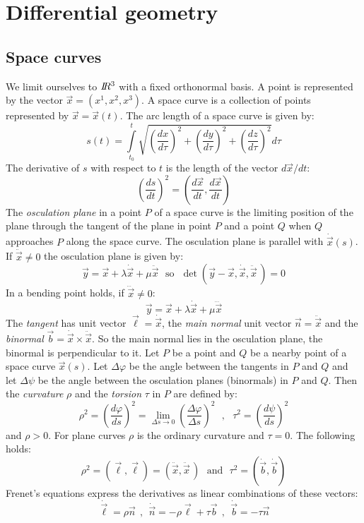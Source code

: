 \documentclass[twoside]{report}
\begin{document}
\section{Differential geometry}
\subsection{Space curves}
We limit ourselves to $I\hspace{-1mm}R^3$ with a fixed orthonormal basis. A point is
represented by the vector $\vec{x}=(x^1,x^2,x^3)$. A space curve is a
collection of points represented by $\vec{x}=\vec{x}(t)$. The arc length of a
space curve is given by:
\[
s(t)=\int\limits_{t_0}^t\sqrt{\left(\frac{dx}{d\tau}\right)^2+\left(\frac{dy}{d\tau}\right)^2+\left(\frac{dz}{d\tau}\right)^2}d\tau
\]
The derivative of $s$ with respect to $t$ is the length of the vector $d\vec{x}/dt$:
\[
\left(\frac{ds}{dt}\right)^2=\left(\frac{d\vec{x}}{dt},\frac{d\vec{x}}{dt}\right)
\]
The {\it osculation plane} in a point $P$ of a space curve is the limiting
position of the plane through the tangent of the plane in point $P$ and a point
$Q$ when $Q$ approaches $P$ along the space curve. The osculation plane is
parallel with $\dot{\vec{x}}(s)$. If $\ddot{\vec{x}}\neq0$ the osculation
plane is given by:
\[
\vec{y}=\vec{x}+\lambda\dot{\vec{x}}+\mu\ddot{\vec{x}}~~~\mbox{so}~~~
\det(\vec{y}-\vec{x},\dot{\vec{x}},\ddot{\vec{x}}\,)=0
\]
In a bending point holds, if $\dddot{\vec{x}}\neq0$:
\[
\vec{y}=\vec{x}+\lambda\dot{\vec{x}}+\mu\dddot{\vec{x}}
\]
The {\it tangent} has unit vector $\vec{\ell}=\dot{\vec{x}}$, the
{\it main normal} unit vector $\vec{n}=\ddot{\vec{x}}$ and the
{\it binormal} $\vec{b}=\dot{\vec{x}}\times\ddot{\vec{x}}$. So the main normal
lies in the osculation plane, the binormal is perpendicular to it.
\npar
Let $P$ be a point and $Q$ be a nearby point of a space curve $\vec{x}(s)$.
Let $\Delta\varphi$ be the angle between the tangents in $P$ and $Q$ and let
$\Delta\psi$ be the angle between the osculation planes (binormals) in $P$ and
$Q$. Then the {\it curvature} $\rho$ and the {\it torsion} $\tau$ in $P$ are
defined by:
\[
\rho^2=\left(\frac{d\varphi}{ds}\right)^2=\lim_{\Delta s\rightarrow0}\left(\frac{\Delta\varphi}{\Delta s}\right)^2~~~,~~~
\tau^2=\left(\frac{d\psi}{ds}\right)^2
\]
and $\rho>0$. For plane curves $\rho$ is the ordinary curvature and
$\tau=0$. The following holds:
\[
\rho^2=(\vec{\ell},\vec{\ell})=(\ddot{\vec{x}},\ddot{\vec{x}}\,)~~~\mbox{and}~~~
\tau^2=(\dot{\vec{b}},\dot{\vec{b}})
\]
Frenet's equations express the derivatives as linear combinations of these
vectors:
\[
\dot{\vec{\ell}}=\rho\vec{n}~~,~~\dot{\vec{n}}=-\rho\vec{\ell}+\tau\vec{b}~~,~~
\dot{\vec{b}}=-\tau\vec{n}
\]
\end{document}
